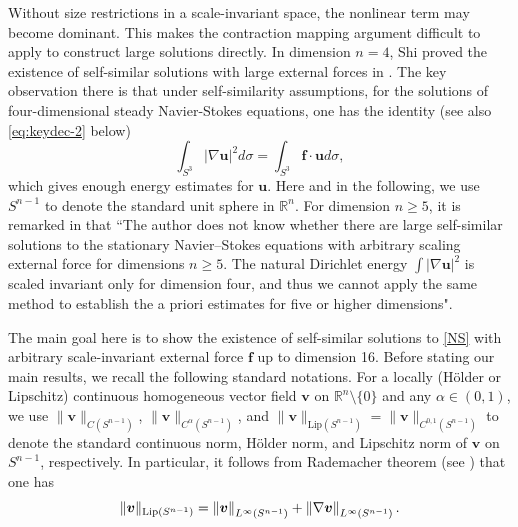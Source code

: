 \documentclass[12pt]{amsart}
\newcommand{\Bv}{{\boldsymbol{v}}}
\newcommand{\Bu}{{\boldsymbol{u}}}
\newcommand{\Bf}{{\boldsymbol{f}}}
\begin{document}
	Without size restrictions in a scale-invariant space, the nonlinear term may become dominant. This makes the contraction mapping argument difficult to apply to construct large solutions directly.
	In dimension  $n=4$,  Shi proved the existence of self-similar solutions with large external forces in \cite{Shi18}. The key observation there is that under self-similarity assumptions, for the solutions of four-dimensional steady Navier-Stokes equations, one has the identity (see also \eqref{eq:keydec-2} below)
	$$\int_{S^{3}} |\nabla \Bu|^2 d\sigma
	= 	\int_{S^{3}} \Bf\cdot \Bu d\sigma,$$ which gives enough energy estimates for $\Bu$. 
	Here and in the following, we use    $S^{n-1}$ to denote the standard unit sphere in $\mathbb{R}^n$.
	For dimension $n\geq 5$, it is remarked in \cite[Section 5]{Shi18} that ``The author does not know whether there are large self-similar solutions to the stationary Navier–Stokes equations with arbitrary scaling external force for dimensions $ n\geq 5$. The natural Dirichlet energy $\int |\nabla \Bu|^2$ is scaled invariant only
	for dimension four, and thus we cannot apply the same method to establish the a priori estimates
	for five or higher dimensions".
	
	
	
	The main goal here is to show the existence of self-similar solutions to \eqref{NS} with arbitrary scale-invariant external force $\Bf$ up to dimension 16. Before stating our main results, we recall the following standard notations. 
	For  a  locally (H\"{o}lder or Lipschitz) continuous
	homogeneous vector field $\Bv$ on $\mathbb{R}^n\setminus \{0\}$ and any $\alpha\in (0,1)$, we use $\|\Bv\|_{C(S^{n-1})}$,    $\|\Bv\|_{C^\alpha(S^{n-1})}$, and $\|\Bv\|_{\textrm{Lip}(S^{n-1})}=\|\Bv\|_{C^{0,1}(S^{n-1})}$ to denote the standard continuous norm, H\"{o}lder norm, and Lipschitz norm 
	of $\Bv$ on $S^{n-1}$,
	respectively. In particular, it follows from Rademacher theorem (see \cite[Theorem 3.2]{EvansG}) that one has
	\begin{equation*}
		\|\Bv\|_{\textnormal{Lip}(S^{n-1})}= \left\| \Bv\right\|_{L^\infty(S^{n-1})} + \left\|\nabla \Bv\right\|_{L^\infty(S^{n-1})}.
	\end{equation*}
	
\end{document}
